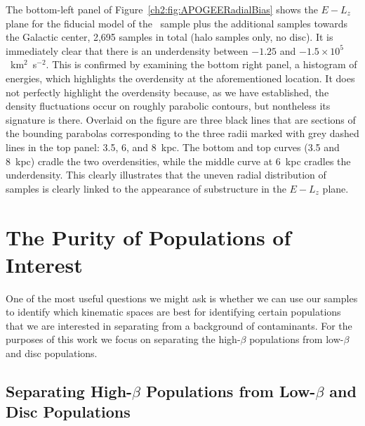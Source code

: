 The bottom-left panel of Figure~\ref{ch2:fig:APOGEERadialBias} shows the $E-L_{z}$ plane for the fiducial model of the \survey\ sample plus the additional samples towards the Galactic center, 2,695 samples in total (halo samples only, no disc). It is immediately clear that there is an underdensity between $-1.25$ and $-1.5\times10^{5}$~km$^{2}$~s$^{-2}$. This is confirmed by examining the bottom right panel, a histogram of energies, which highlights the overdensity at the aforementioned location. It does not perfectly highlight the overdensity because, as we have established, the density fluctuations occur on roughly parabolic contours, but nontheless its signature is there. Overlaid on the figure are three black lines that are sections of the bounding parabolas corresponding to the three radii marked with grey dashed lines in the top panel: 3.5, 6, and 8~kpc. The bottom and top curves (3.5 and 8~kpc) cradle the two overdensities, while the middle curve at 6~kpc cradles the underdensity. This clearly illustrates that the uneven radial distribution of samples is clearly linked to the appearance of substructure in the $E-L_{z}$ plane.

\section{The Purity of Populations of Interest}
\label{ch2:sec:PurityOfPopulations}

One of the most useful questions we might ask is whether we can use our samples to identify which kinematic spaces are best for identifying certain populations that we are interested in separating from a background of contaminants. For the purposes of this work we focus on separating the high-$\beta$ populations from low-$\beta$ and disc populations.

\subsection{Separating High-\texorpdfstring{$\beta$}{beta} Populations from Low-\texorpdfstring{$\beta$}{beta} and Disc Populations}
\label{ch2:subsec:SeparatingHighBetaPopulations}

